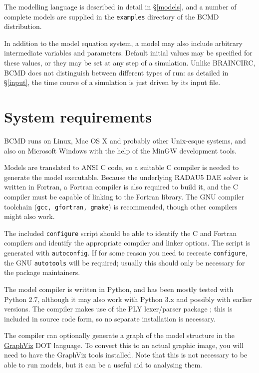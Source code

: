 \documentclass[a4paper,11pt]{article}
\begin{document}
The modelling language is described in detail in \S\ref{models}, and a number of complete models are supplied in the \texttt{examples} directory of the BCMD distribution.

In addition to the model equation system, a model may also include arbitrary intermediate variables and parameters. Default initial values may be specified for these values, or they may be set at any step of a simulation. Unlike BRAINCIRC, BCMD does not distinguish between different types of run: as detailed in \S\ref{input}, the time course of a simulation is just driven by its input file.

\section{System requirements}\label{reqs}

BCMD runs on Linux, Mac OS X and probably other Unix-esque systems, and also on Microsoft Windows with the help of the MinGW development tools.

Models are translated to ANSI C code, so a suitable C compiler is needed to generate the model executable. Because the underlying RADAU5 DAE solver is written in Fortran, a Fortran compiler is also required to build it, and the C compiler must be capable of linking to the Fortran library. The GNU compiler toolchain (\texttt{gcc, gfortran, gmake}) is recommended, though other compilers might also work.

The included \texttt{configure} script should be able to identify the C and Fortran compilers and identify the appropriate compiler and linker options. The script is generated with \texttt{autoconfig}. If for some reason you need to recreate \texttt{configure}, the GNU \texttt{autotools} will be required; usually this should only be necessary for the package maintainers.

The model compiler is written in Python, and has been mostly tested with Python 2.7, although it may also work with Python 3.x and possibly with earlier versions. The compiler makes use of the PLY lexer/parser package \citep{PLYPythonLexYacc:n3B3Rbqj}; this is included in source code form, so no separate installation is necessary.

The compiler can optionally generate a graph of the model structure in the \href{http://www.graphviz.org}{GraphViz} DOT language. To convert this to an actual graphic image, you will need to have the GraphViz tools installed. Note that this is not necessary to be able to run models, but it can be a useful aid to analysing them.
\end{document}
